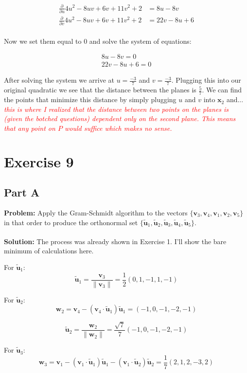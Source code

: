 \documentclass{article}
\begin{document}
\begin{align*}
  \frac{\partial}{\partial u}4u^2-8uv+6v+11v^2+2&=8u-8v\\
  \frac{\partial}{\partial v}4u^2-8uv+6v+11v^2+2&=22v-8u+6\\
\end{align*}

Now we set them equal to 0 and solve the system of equations:

\begin{gather*}
  8u-8v=0\\
  22v-8u+6=0
\end{gather*}

After solving the system we arrive at $u=\frac{-3}{7}$ and $v=\frac{-3}{7}$. Plugging this into our original quadratic we see that the distance between the planes is $\frac{5}{7}$. We can find the points that minimize this distance by simply plugging $u$ and $v$ into $\mathbf x_2$ and... \textit{\textcolor{red}{this is where I realized that the distance between two points on the planes is (given the botched questions) dependent only on the second plane. This means that any point on $P$ would suffice which makes no sense.}}

\section*{Exercise 9}
\subsection*{Part A}
\textbf{Problem:} Apply the Gram-Schmidt algorithm to the vectors $\{\mathbf v_3, \mathbf v_4, \mathbf v_1, \mathbf v_2, \mathbf v_5\}$ in that order to produce the orthonormal set $\{\tilde{\mathbf u}_1, \tilde{\mathbf u}_2, \tilde{\mathbf u}_3, \tilde{\mathbf u}_4, \tilde{\mathbf u}_5\}$.
\\\\
\textbf{Solution:} The process was already shown in Exercise 1. I'll show the bare minimum of calculations here.

For $\tilde{\mathbf u}_1$:
$$\tilde{\mathbf u}_1=\frac{\mathbf v_3}{\|\mathbf v_3\|}=\frac{1}{2}(0,1,-1,1,-1)$$

For $\tilde{\mathbf u}_2$:
$$\mathbf w_2=\mathbf v_4-(\mathbf v_4\cdot\tilde{\mathbf u}_1)\tilde{\mathbf u}_1=(-1,0,-1,-2,-1)$$

$$\tilde{\mathbf u}_2=\frac{\mathbf w_2}{\|\mathbf w_2\|}=\frac{\sqrt 7}{7}(-1,0,-1,-2,-1)$$

For $\tilde{\mathbf u}_3$:
$$\mathbf w_3=\mathbf v_1-(\mathbf v_1\cdot\tilde{\mathbf u}_1)\tilde{\mathbf u}_1-(\mathbf v_1\cdot\tilde{\mathbf u}_2)\tilde{\mathbf u}_2=\frac{1}{7}(2,1,2,-3,2)$$
\end{document}
